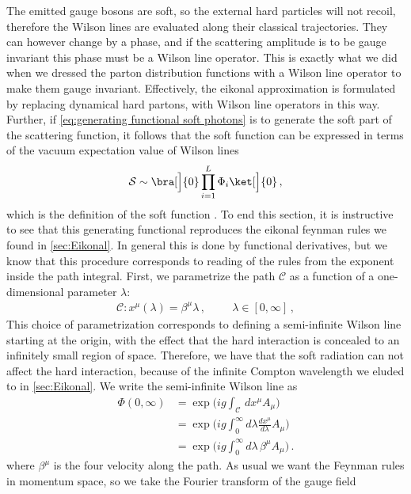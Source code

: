 The emitted gauge bosons are soft, so the external hard particles will not recoil, therefore the Wilson lines are evaluated along their classical trajectories. They can however change by a phase, and if the scattering amplitude is to be gauge invariant this phase must be a Wilson line operator. This is exactly what we did when we dressed the parton distribution functions with a Wilson line operator to make them gauge invariant. Effectively, the eikonal approximation is formulated by replacing dynamical hard partons, with Wilson line operators in this way. Further, if \cref{eq:generating functional soft photons} is to generate the soft part of the scattering function, it follows that the soft function can be expressed in terms of the vacuum expectation value of Wilson lines
\begin{align}
    \mathcal{S}\sim \bra[\Big]{0}\prod_{i=1}^{L}\Phi_i\ket[\Big]{0}\,,
\end{align}
which is the definition of the soft function \cite{Korchemsky:1992xv}. To end this section, it is instructive to see that this generating functional reproduces the eikonal feynman rules we found in \cref{sec:Eikonal}. In general this is done by functional derivatives, but we know that this procedure corresponds to reading of the rules from the exponent inside the path integral. First, we parametrize the path $\mathcal{C}$ as a function of a one-dimensional parameter $\lambda$:
\begin{align}
    \mathcal{C}: x^{\mu}(\lambda)=\beta^{\mu}\lambda\,,\hspace{1cm}\lambda\in[0,\infty]\,,
\end{align}
This choice of parametrization corresponds to defining a semi-infinite Wilson line starting at the origin, with the effect that the hard interaction is concealed to an infinitely small region of space. Therefore, we have that the soft radiation can not affect the hard interaction, because of the infinite Compton wavelength we eluded to in \cref{sec:Eikonal}. We write the semi-infinite Wilson line as
\begin{align}
    \Phi(0,\infty)&=\exp\big(ig\int_{\mathcal{C}}\,dx^{\mu}A_{\mu}\big)\nonumber
    \\
    &=\exp\big(ig\int_{0}^{\infty}d\lambda\frac{dx^{\mu}}{d\lambda}A_{\mu}\big)\nonumber
    \\
    &=\exp\big(ig\int_{0}^{\infty}d\lambda\,\beta^{\mu}A_{\mu}\big)\,.
\end{align}
where $\beta^{\mu}$ is the four velocity along the path. As usual we want the Feynman rules in momentum space, so we take the Fourier transform of the gauge field
